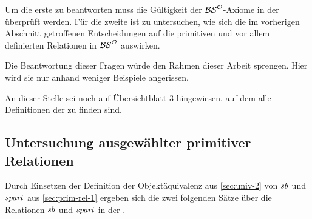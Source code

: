     Um die erste %
    zu beantworten muss die Gültigkeit der $\mathcal{BS}^{\mathcal{O}}$-Axiome in der \strukt überprüft werden.
    Für die zweite ist zu untersuchen, wie sich die im vorherigen Abschnitt getroffenen Entscheidungen auf die primitiven und vor allem definierten Relationen in $\mathcal{BS}^{\mathcal{O}}$ auswirken.

    Die Beantwortung dieser Fragen würde den Rahmen dieser Arbeit sprengen. 
    Hier wird sie nur anhand weniger Beispiele angerissen.
    
    An dieser Stelle sei noch auf Übersichtblatt 3 hingewiesen, auf dem alle Definitionen der \strukt zu finden sind.
    

\subsection{Untersuchung ausgewählter primitiver Relationen}
    Durch Einsetzen der Definition der Objektäquivalenz aus \ref{sec:univ-2} von $\mathit{sb}$ und $\mathit{spart}$ aus \ref{sec:prim-rel-1} ergeben sich die zwei folgenden Sätze über die Relationen $\mathit{sb}$ und $\mathit{spart}$ in der \strukt.

